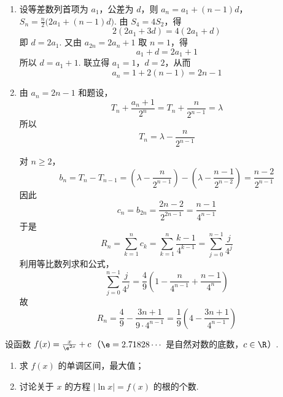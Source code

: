 \begin{solution}
\begin{enumerate}
\item
设等差数列首项为 \(a_1\)，公差为 \(d\)，则
\(a_n=a_1+(n-1)d\)，\(S_n=\frac n2\bigl(2a_1+(n-1)d\bigr)\).
由 \(S_4=4S_2\)，得
\[
2(2a_1+3d)=4(2a_1+d)
\]
即 \(d=2a_1\). 又由 \(a_{2n}=2a_n+1\) 取 \(n=1\)，得
\[
a_1+d=2a_1+1
\]
所以 \(d=a_1+1\). 联立得 \(a_1=1\)，\(d=2\)，从而
\[
a_n=1+2(n-1)=2n-1
\]

\item
由 \(a_n=2n-1\) 和题设，
\[
T_n+\frac{a_n+1}{2^n}
=T_n+\frac{n}{2^{n-1}}=\lambda
\]
所以
\[
T_n=\lambda-\frac{n}{2^{n-1}}
\]

对 \(n\geq2\)，
\[
b_n=T_n-T_{n-1}
=\left(\lambda-\frac{n}{2^{n-1}}\right)
-\left(\lambda-\frac{n-1}{2^{n-2}}\right)
=\frac{n-2}{2^{n-1}}
\]
因此
\[
c_n=b_{2n}=\frac{2n-2}{2^{2n-1}}=\frac{n-1}{4^{n-1}}
\]
于是
\[
R_n=\sum_{k=1}^n c_k
=\sum_{k=1}^n\frac{k-1}{4^{k-1}}
=\sum_{j=0}^{n-1}\frac{j}{4^j}
\]
利用等比数列求和公式，
\[
\sum_{j=0}^{n-1}\frac{j}{4^j}
=\frac49\left(1-\frac{n}{4^{n-1}}+\frac{n-1}{4^n}\right)
\]
故
\[
R_n=\frac49-\frac{3n+1}{9\cdot4^{n-1}}
=\frac{1}{9}\left(4-\frac{3n+1}{4^{n-1}}\right)
\]
\end{enumerate}
\end{solution}

\begin{problem}
设函数 \(f(x) = \frac{x}{\e^{2x}} + c\)（\(\e = 2.71828\cdots\) 是自然对数的底数，\(c \in \R\)）.
\begin{enumerate}
\item 求 \(f(x)\) 的单调区间，最大值；
\item 讨论关于 \(x\) 的方程 \(\lvert \ln x \rvert = f(x)\) 的根的个数.
\end{enumerate}
\end{problem}

